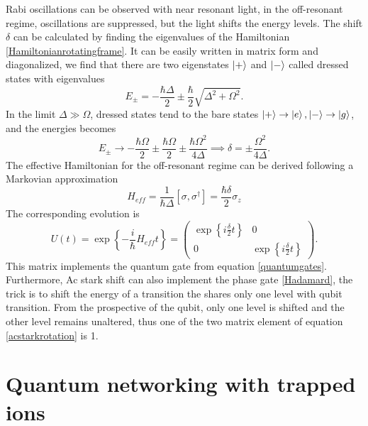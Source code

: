 Rabi oscillations can be observed with near resonant light, in the off-resonant regime, oscillations are suppressed, but the light shifts the energy levels.
The shift $\delta$ can be calculated by finding the eigenvalues of the Hamiltonian \eqref{Hamiltonianrotatingframe}. It can be easily written in matrix form and diagonalized, we find that there are two eigenstates $\ket{+}$ and $\ket{-}$ called dressed states with eigenvalues
\begin{equation}
E_{\pm} = -\frac{\hbar\Delta}{2} \pm \frac{\hbar}{2}\sqrt{\Delta^2 +\Omega^2}.
\end{equation}
In the limit $\Delta \gg \Omega$, dressed states tend to the bare states $\ket{+} \to \ket{e},\ket{-}\to \ket{g}$, and the energies becomes
\begin{equation}
E_{\pm} \to -\frac{\hbar \Omega}{2} \pm \frac{\hbar \Omega}{2} \pm \frac{\hbar \Omega^2}{4\Delta} \implies \delta = \pm\frac{\Omega^2}{4\Delta}.
\end{equation}
The effective Hamiltonian for the off-resonant regime can be derived following a Markovian approximation \cite{acstarkhamiltonian}
\begin{equation}
H_{eff} = \frac{1}{\hbar \Delta} [\sigma,\sigma^\dagger] = \frac{\hbar \delta}{2}\sigma_z
\end{equation}
The corresponding evolution is
\begin{equation}
\label{acstarkrotation}
U(t) = \exp\left\{-\frac{i}{\hbar} H_{eff} t \right\} =
 \begin{pmatrix}
   \exp\left\{i\frac{\delta}{2}t\right\} & 0\\
   0 & \exp\left\{i\frac{\delta}{2}t\right\}
\end{pmatrix}.
\end{equation}
This matrix implements the quantum gate from equation \eqref{quantumgates}. Furthermore, Ac stark shift can also implement the phase gate \eqref{Hadamard}, the trick is to shift the energy of a transition the shares only one level with qubit transition. From the prospective of the qubit, only one level is shifted and the other level remains unaltered, thus one of the two matrix element of equation \eqref{acstarkrotation} is 1.

\section{Quantum networking with trapped ions}
